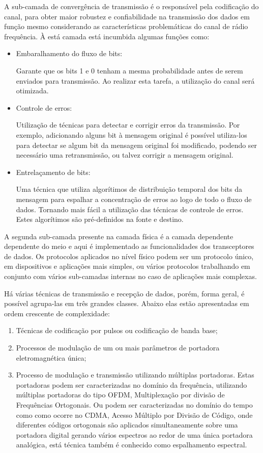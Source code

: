 A sub-camada de convergência de transmissão é o responsável pela codificação do canal, para obter maior robustez e confiabilidade na transmissão dos dados em função mesmo considerando as características problemáticas do canal de rádio frequência. À está camada está incumbida algumas funções como:
\begin{itemize}
    \item Embaralhamento do fluxo de bits:

          Garante que os bits 1 e 0 tenham a mesma probabilidade antes de serem enviados para transmissão. Ao realizar esta tarefa, a utilização do canal será otimizada.
    \item Controle de erros:

          Utilização de técnicas para detectar e corrigir erros da transmissão. Por exemplo, adicionando alguns bit à mensagem original é possível utiliza-los para detectar se algum bit da mensagem original foi modificado, podendo ser necessário uma retransmissão, ou talvez corrigir a mensagem original.
    \item Entrelaçamento de bits:

          Uma técnica que utiliza algorítimos de distribuição temporal dos bits da mensagem para espalhar a concentração de erros ao logo de todo o fluxo de dados. Tornando mais fácil a utilização das técnicas de controle de erros. Estes algorítimos são pré-definidos na fonte e destino.
\end{itemize}

A segunda sub-camada presente na camada física é a camada dependente dependente do meio e aqui é implementado as funcionalidades dos transceptores de dados. Os protocolos aplicados no nível físico podem ser um protocolo único, em dispositivos e aplicações mais simples, ou vários protocolos trabalhando em conjunto com vários sub-camadas internas no caso de aplicações mais complexas.

Há várias técnicas de transmissão e recepção de dados, porém, forma geral, é possível agrupa-las em três grandes classes. Abaixo elas estão apresentadas em ordem crescente de complexidade:
\begin{enumerate}
    \item Técnicas de codificação por pulsos ou codificação de banda base;
    \item Processos de modulação de um ou mais parâmetros de portadora eletromagnética única;
    \item Processo de modulação e transmissão utilizando múltiplas portadoras. Estas portadoras podem ser caracterizadas no domínio da frequência, utilizando múltiplas portadoras do tipo OFDM, Multiplexação por divisão de Frequências Ortogonais. Ou podem ser caracterizadas no domínio do tempo como como ocorre no CDMA, Acesso Múltiplo por Divisão de Código, onde diferentes códigos ortogonais são aplicados simultaneamente sobre uma portadora digital gerando vários espectros ao redor de uma única portadora analógica, está técnica também é conhecido como espalhamento espectral.
\end{enumerate}

